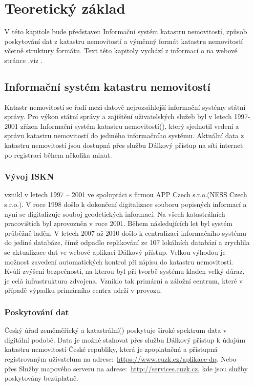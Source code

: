 \chapter{Teoretický základ}
\label{2-teorie}
V této kapitole bude představen Informační systém katastru nemovitostí, způsob poskytování dat z katastru nemovitostí a výměnný formát katastru nemovitostí včetně struktury formátu. Text této kapitoly vychází z informací o  na webové stránce ,viz \cite{iskn}.

\section{Informační systém katastru nemovitostí}
Katastr nemovitostí se řadí mezi datově nejrozsáhlejší informační systémy státní správy. Pro výkon státní správy a zajištění uživatelských služeb byl v letech 1997-2001 zřízen Informační systém katastru nemovitostí(), který sjednotil vedení a správu katastru nemovitostí do jediného informačního systému. Aktuální data z katastru nemovitostí jsou dostupná přes službu Dálkový přístup na síti internet po registraci během několika minut. 
\subsection{Vývoj ISKN}
 vznikl v letech 1997 -- 2001 ve spolupráci s firmou APP Czech s.r.o.(NESS Czech s.r.o.). V roce 1998 došlo k dokončení digitalizace souboru popisných informací a nyní se digitalizuje souboj geodetických informací. Na všech katastrálních pracovištích byl  zprovozněn v roce 2001. Během následujících let byl systém průběžně laděn. V letech 2007 až 2010 došlo k centralizaci informačního systému do jediné databáze, čímž odpadlo replikování ze 107 lokálních databází a zrychlila se aktualizace dat ve webové aplikaci Dálkový přístup. Velkou výhodou  je možnost zavedení automatických kontrol při zápisu do katastru nemovitostí. Kvůli zvýšení bezpečnosti, na kterou byl při tvorbě systému kladen velký důraz, je celá infrastruktura zdvojena. Vzniklo tak primární a záložní centrum, které v případě výpadku primárního centra udrží  v provozu.
\subsection{Poskytování dat}
Český úřad zeměměřický a katastrální() poskytuje široké spektrum data v digitální podobě. Data je možné stahovat přes službu Dálkový přístup k údajům katastru nemovitostí České republiky, která je zpoplatněná a přístupná registrovaným uživatelům na adrese:~\href{https://www.cuzk.cz/aplikace-dp}{https://www.cuzk.cz/aplikace-dp}. Nebo přes Služby mapového serveru na adrese:~\href{http://services.cuzk.cz/}{http://services.cuzk.cz}, kde jsou služby poskytovány bezúplatně.


